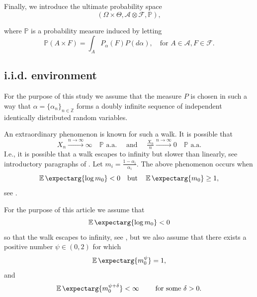 \documentclass[12pt]{article}
\newcommand{\Pro}{\mathbb{P}}
\newcommand{\converges}{\xrightarrow{n \rightarrow \infty}}
\newcommand{\expect}{\operatorname{\mathbb{E}}\expectarg}
\begin{document}
Finally, we introduce the ultimate probability space
\begin{equation}
    (\Omega \times \Theta, \mathcal{A} \otimes \mathcal{F}, \Pro),
\end{equation}

where $\Pro$ is a probability measure induced by letting 
\begin{equation*}
     \Pro( A \times F ) = \int_A P_\alpha(F) P(d\alpha), \quad \text{for }  A \in \mathcal{A}, F \in \mathcal{F}.
\end{equation*}

\subsection{i.i.d. environment}
For the purpose of this study we assume that the measure $P$ is chosen in such a way that $\alpha = \{ \alpha_n\}_{n \in \mathbb{Z}} $ forms a doubly infinite sequence of independent identically distributed random variables.

An extraordinary phenomenon is known for such a walk. It is possible that 
\begin{equation*}
    X_n \converges \infty \quad  \Pro \text{ a.a.} \quad \text{ and } \quad  \tfrac{X_n}{n} \converges 0 \quad \Pro \text{ a.a.}
\end{equation*}
I.e., it is possible that a walk escapes to  infinity but slower than linearly, see introductory paragraphs of \cite{KKS}. Let $m_i = \frac{1-\alpha_i}{\alpha_i}.$  The above phenomenon occurs when 
\begin{equation} \label{assumptions_v0}
    \expect{\log m_0} < 0 \quad \text{but} \quad \expect {m_0} \geq 1,
\end{equation}
see \cite{SOLOMON}. 
\bigskip

For the purpose of this article we assume that 
\begin{equation} \label{assumptions}
    \expect{\log m_0} < 0
\end{equation}
so that the walk escapes to infinity, see \cite{KKS}, but we also assume that there exists a positive number $\psi \in (0, 2)$ for which
\begin{equation}\label{eq:assump1}
    \expect{ m_0^\psi } = 1, 
\end{equation}
and 
\begin{equation}\label{eq:assump2}
    \expect{ m_0^{\psi + \delta} } < \infty \qquad  \text{ for some } \delta > 0.
\end{equation}
\end{document}
